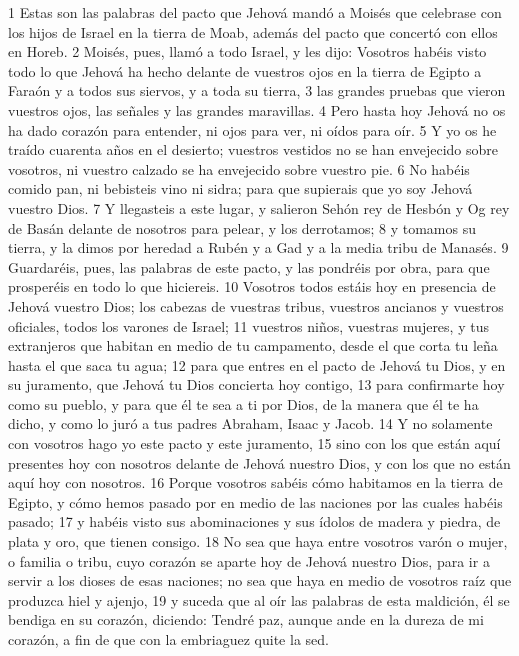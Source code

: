 1 Estas son las palabras del pacto que Jehová mandó a Moisés que celebrase con los hijos de Israel en la tierra de Moab, además del pacto que concertó con ellos en Horeb.
2 Moisés, pues, llamó a todo Israel, y les dijo: Vosotros habéis visto todo lo que Jehová ha hecho delante de vuestros ojos en la tierra de Egipto a Faraón y a todos sus siervos, y a toda su tierra, 
3 las grandes pruebas que vieron vuestros ojos, las señales y las grandes maravillas.
4 Pero hasta hoy Jehová no os ha dado corazón para entender, ni ojos para ver, ni oídos para oír.
5 Y yo os he traído cuarenta años en el desierto; vuestros vestidos no se han envejecido sobre vosotros, ni vuestro calzado se ha envejecido sobre vuestro pie.
6 No habéis comido pan, ni bebisteis vino ni sidra; para que supierais que yo soy Jehová vuestro Dios.
7 Y llegasteis a este lugar, y salieron Sehón rey de Hesbón y Og rey de Basán delante de nosotros para pelear, y los derrotamos;
8 y tomamos su tierra, y la dimos por heredad a Rubén y a Gad y a la media tribu de Manasés. 
9 Guardaréis, pues, las palabras de este pacto, y las pondréis por obra, para que prosperéis en todo lo que hiciereis.
10 Vosotros todos estáis hoy en presencia de Jehová vuestro Dios; los cabezas de vuestras tribus, vuestros ancianos y vuestros oficiales, todos los varones de Israel;
11 vuestros niños, vuestras mujeres, y tus extranjeros que habitan en medio de tu campamento, desde el que corta tu leña hasta el que saca tu agua;
12 para que entres en el pacto de Jehová tu Dios, y en su juramento, que Jehová tu Dios concierta hoy contigo,
13 para confirmarte hoy como su pueblo, y para que él te sea a ti por Dios, de la manera que él te ha dicho, y como lo juró a tus padres Abraham, Isaac y Jacob.
14 Y no solamente con vosotros hago yo este pacto y este juramento,
15 sino con los que están aquí presentes hoy con nosotros delante de Jehová nuestro Dios, y con los que no están aquí hoy con nosotros.
16 Porque vosotros sabéis cómo habitamos en la tierra de Egipto, y cómo hemos pasado por en medio de las naciones por las cuales habéis pasado; 
17 y habéis visto sus abominaciones y sus ídolos de madera y piedra, de plata y oro, que tienen consigo.
18 No sea que haya entre vosotros varón o mujer, o familia o tribu, cuyo corazón se aparte hoy de Jehová nuestro Dios, para ir a servir a los dioses de esas naciones; no sea que haya en medio de vosotros raíz que produzca hiel y ajenjo, 
19 y suceda que al oír las palabras de esta maldición, él se bendiga en su corazón, diciendo: Tendré paz, aunque ande en la dureza de mi corazón, a fin de que con la embriaguez quite la sed.
